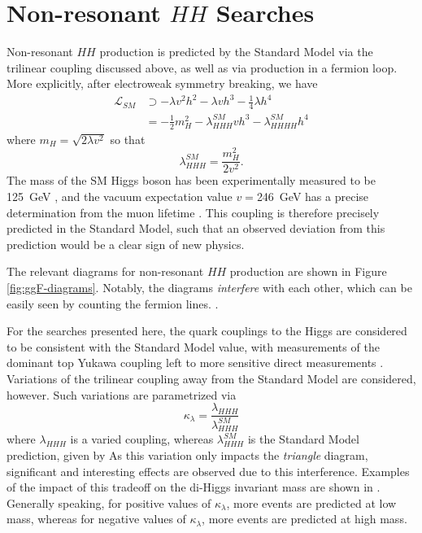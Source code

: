 \section{Non-resonant $HH$ Searches}
Non-resonant $HH$ production is predicted by the Standard Model via the trilinear coupling discussed above,
as well as via production in a fermion loop. More explicitly, after electroweak symmetry breaking, we have
\begin{align}
\mathcal{L}_{SM} &\supset -\lambda v^2h^2 - \lambda v h^3 - \frac{1}{4}\lambda h^4\\
&= -\frac{1}{2}m_{H}^2 - \lambda_{HHH}^{SM}vh^3 - \lambda_{HHHH}^{SM}h^4
\end{align}
where $m_{H} = \sqrt{2\lambda v^2}$ so that 
\begin{equation}
\lambda_{HHH}^{SM} = \frac{m_{H}^2}{2v^2}.
\end{equation}
The mass of the SM Higgs boson has been experimentally measured to be \SI{125}{\GeV} , and 
the vacuum expectation value $v=$\SI{246}{\GeV} has a precise determination from the muon lifetime . 
This coupling is therefore precisely predicted in the Standard Model, such that an observed deviation from 
this prediction would be a clear sign of new physics. 

The relevant diagrams for non-resonant $HH$ production are shown in Figure \ref{fig:ggF-diagrams}.
Notably, the diagrams \emph{interfere} with each other, which can be easily seen by counting the fermion lines.
.

For the searches presented here, the quark couplings to the Higgs are considered to be consistent with the Standard 
Model value, with measurements of the dominant top Yukawa coupling left to more sensitive direct measurements . Variations of the trilinear coupling away from the Standard 
Model are considered, however. Such variations are parametrized via 
\begin{equation}
\kappa_{\lambda} = \frac{\lambda_{HHH}}{\lambda_{HHH}^{SM}}
\end{equation}
where $\lambda_{HHH}$ is a varied coupling, whereas $\lambda_{HHH}^{SM}$ is the Standard Model prediction, given by
As this variation only impacts the \emph{triangle} diagram, significant and interesting effects are observed due to this interference. Examples of the impact of this tradeoff on the di-Higgs invariant mass are shown in . Generally speaking, for positive values of $\kappa_{\lambda}$, more events are predicted at low mass, whereas for negative values of $\kappa_{\lambda}$, more events are predicted at high mass.
